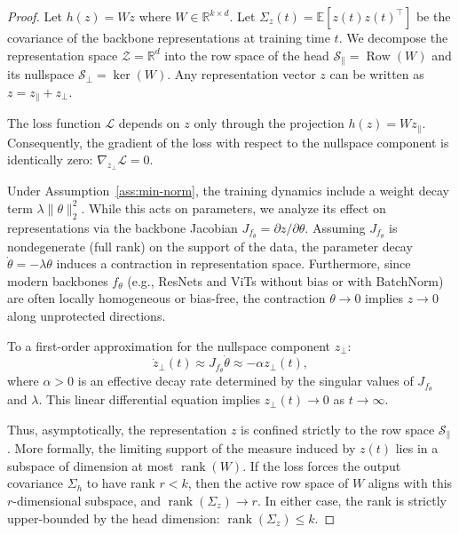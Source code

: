 \documentclass{article}
\theoremstyle{plain}
\theoremstyle{definition}
\theoremstyle{remark}
\begin{document}
\begin{proof}
Let $h(z) = Wz$ where $W \in \mathbb{R}^{k \times d}$. Let $\Sigma_z(t) = \mathbb{E}[z(t) z(t)^\top]$ be the covariance of the backbone representations at training time $t$. We decompose the representation space $\mathcal{Z} = \mathbb{R}^d$ into the row space of the head $\mathcal{S}_{\parallel} = \operatorname{Row}(W)$ and its nullspace $\mathcal{S}_{\perp} = \ker(W)$.
Any representation vector $z$ can be written as $z = z_{\parallel} + z_{\perp}$.

The loss function $\mathcal{L}$ depends on $z$ only through the projection $h(z) = W z_{\parallel}$. Consequently, the gradient of the loss with respect to the nullspace component is identically zero: $\nabla_{z_{\perp}} \mathcal{L} = 0$.

Under Assumption~\ref{ass:min-norm}, the training dynamics include a weight decay term $\lambda \|\theta\|^2_2$. While this acts on parameters, we analyze its effect on representations via the backbone Jacobian $J_{f_\theta} = \partial z / \partial \theta$. Assuming $J_{f_\theta}$ is nondegenerate (full rank) on the support of the data, the parameter decay $\dot{\theta} = -\lambda \theta$ induces a contraction in representation space. 
Furthermore, since modern backbones $f_\theta$ (e.g., ResNets and ViTs without bias or with BatchNorm) are often locally homogeneous or bias-free, the contraction $\theta \to 0$ implies $z \to 0$ along unprotected directions.

To a first-order approximation for the nullspace component $z_{\perp}$:
\begin{equation*}
    \dot{z}_{\perp}(t) \approx J_{f_\theta} \dot{\theta} \approx -\alpha z_{\perp}(t),
\end{equation*}
where $\alpha > 0$ is an effective decay rate determined by the singular values of $J_{f_\theta}$ and $\lambda$.
This linear differential equation implies $z_{\perp}(t) \to 0$ as $t \to \infty$.

Thus, asymptotically, the representation $z$ is confined strictly to the row space $\mathcal{S}_{\parallel}$. More formally, the limiting support of the measure induced by $z(t)$ lies in a subspace of dimension at most $\operatorname{rank}(W)$. If the loss forces the output covariance $\Sigma_h$ to have rank $r < k$, then the active row space of $W$ aligns with this $r$-dimensional subspace, and $\operatorname{rank}(\Sigma_z) \to r$. In either case, the rank is strictly upper-bounded by the head dimension: $\operatorname{rank}(\Sigma_z) \le k$.
\end{proof}
\end{document}
